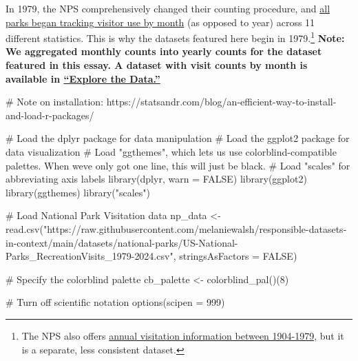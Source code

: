 \documentclass[
  letterpaper,
  DIV=11,
  numbers=noendperiod]{scrartcl}
\newenvironment{Shaded}{\begin{snugshade}}{\end{snugshade}}
\newcommand{\AttributeTok}[1]{\textcolor[rgb]{0.40,0.45,0.13}{#1}}
\newcommand{\CommentTok}[1]{\textcolor[rgb]{0.37,0.37,0.37}{#1}}
\newcommand{\ConstantTok}[1]{\textcolor[rgb]{0.56,0.35,0.01}{#1}}
\newcommand{\DecValTok}[1]{\textcolor[rgb]{0.68,0.00,0.00}{#1}}
\newcommand{\FunctionTok}[1]{\textcolor[rgb]{0.28,0.35,0.67}{#1}}
\newcommand{\NormalTok}[1]{\textcolor[rgb]{0.00,0.23,0.31}{#1}}
\newcommand{\OtherTok}[1]{\textcolor[rgb]{0.00,0.23,0.31}{#1}}
\newcommand{\StringTok}[1]{\textcolor[rgb]{0.13,0.47,0.30}{#1}}
\begin{document}
In 1979, the NPS comprehensively changed their counting procedure, and
\href{(https://www.nps.gov/subjects/socialscience/visitor-use-statistics-dashboard.htm)}{all
parks began tracking visitor use by month} (as opposed to year) across
11 different statistics. This is why the datasets featured here begin in
1979.\footnote{The NPS also offers
  \href{https://irma.nps.gov/Stats/SSRSReports/National\%20Reports/Query\%20Builder\%20for\%20Historic\%20Annual\%20Recreation\%20Visits\%20(1904\%20-\%201979)}{annual
  visitation information between 1904-1979}, but it is a separate, less
  consistent dataset.} \textbf{Note: We aggregated monthly counts into
yearly counts for the dataset featured in this essay. A dataset with
visit counts by month is available in
\href{?tab=explore-the-data}{``Explore the Data.''}}

\begin{Shaded}
\begin{Highlighting}[]
\CommentTok{\# Note on installation: https://statsandr.com/blog/an{-}efficient{-}way{-}to{-}install{-}and{-}load{-}r{-}packages/}

\CommentTok{\# Load the dplyr package for data manipulation}
\CommentTok{\# Load the ggplot2 package for data visualization}
\CommentTok{\# Load "ggthemes", which let\textquotesingle{}s us use colorblind{-}compatible palettes. When we\textquotesingle{}ve only got one line, this will just be black.}
\CommentTok{\# Load "scales" for abbreviating axis labels}
\FunctionTok{library}\NormalTok{(dplyr, }\AttributeTok{warn =} \ConstantTok{FALSE}\NormalTok{)}
\FunctionTok{library}\NormalTok{(ggplot2)}
\FunctionTok{library}\NormalTok{(ggthemes)}
\FunctionTok{library}\NormalTok{(}\StringTok{"scales"}\NormalTok{)}

\CommentTok{\# Load National Park Visitation data}
\NormalTok{np\_data }\OtherTok{\textless{}{-}} \FunctionTok{read.csv}\NormalTok{(}\StringTok{"https://raw.githubusercontent.com/melaniewalsh/responsible{-}datasets{-}in{-}context/main/datasets/national{-}parks/US{-}National{-}Parks\_RecreationVisits\_1979{-}2024.csv"}\NormalTok{, }\AttributeTok{stringsAsFactors =} \ConstantTok{FALSE}\NormalTok{)}

\CommentTok{\# Specify the colorblind palette}
\NormalTok{cb\_palette }\OtherTok{\textless{}{-}} \FunctionTok{colorblind\_pal}\NormalTok{()(}\DecValTok{8}\NormalTok{)}

\CommentTok{\# Turn off scientific notation}
\FunctionTok{options}\NormalTok{(}\AttributeTok{scipen =} \DecValTok{999}\NormalTok{)}


\end{Highlighting}
\end{Shaded}
\end{document}
